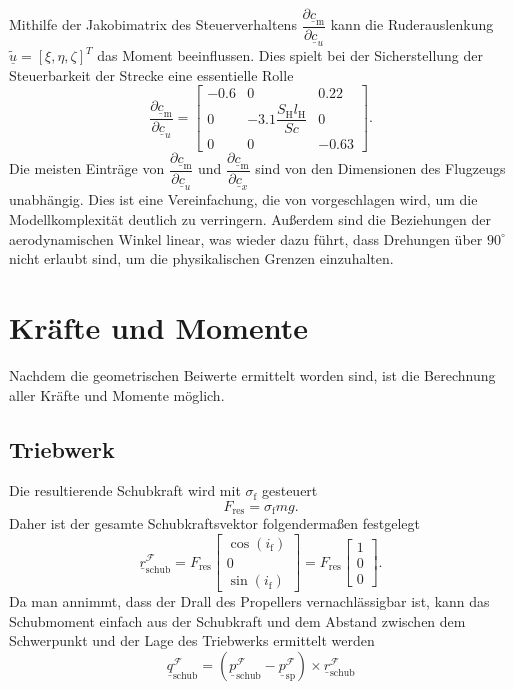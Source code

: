 Mithilfe der Jakobimatrix des Steuerverhaltens $\dfrac{\partial  \underline{c}_\mathrm{m}}{\partial  \underline{c}_u}$ kann die Ruderauslenkung $\tilde{\underline{u}} = [\xi,\eta,
\zeta]^T$ das Moment beeinflussen. Dies spielt bei der Sicherstellung der Steuerbarkeit der Strecke eine essentielle Rolle 
\begin{equation}
\dfrac{\partial  \underline{c}_\mathrm{m}}{\partial  \underline{c}_u} = \begin{bmatrix} 
-0.6 & 0 & 0.22 \\
0 &-3.1\dfrac{S_\mathrm{H}l_\mathrm{H}}{Sc}&0 \\
0 & 0 & -0.63
\end{bmatrix}.
\end{equation}
Die meisten Einträge von $\dfrac{\partial  \underline{c}_\mathrm{m}}{\partial  \underline{c}_u}$ und  $\dfrac{\partial  \underline{c}_\mathrm{m}}{\partial  \underline{c}_x}$ sind von den Dimensionen des Flugzeugs unabhängig. Dies ist eine Vereinfachung, die von \cite{RAMPaper} vorgeschlagen wird, um die Modellkomplexität deutlich  zu verringern. Au{\ss}erdem sind die Beziehungen der aerodynamischen Winkel linear, was wieder dazu führt, dass Drehungen über $90^{\circ}$ nicht erlaubt sind, um die physikalischen Grenzen einzuhalten.
\section{Kräfte und Momente}
\label{sec:Kräfte}
Nachdem die geometrischen Beiwerte ermittelt worden sind, ist die Berechnung aller Kräfte und Momente möglich.
\subsection{Triebwerk}
Die resultierende Schubkraft wird mit $\sigma_\mathrm{f}$ gesteuert
\begin{equation}
F_\mathrm{res} = \sigma_\mathrm{f} mg.
\end{equation}
Daher ist der gesamte Schubkraftsvektor folgenderma{\ss}en festgelegt
\begin{equation}
\underline{r}^\mathcal{F}_\mathrm{schub} = F_\mathrm{res}\begin{bmatrix} 
\cos(i_\mathrm{f})\\
0\\
\sin(i_\mathrm{f})
\end{bmatrix} = F_\mathrm{res}\begin{bmatrix} 
1\\
0\\
0
\end{bmatrix}.
\end{equation}
Da man annimmt, dass der Drall des Propellers vernachlässigbar ist, kann das Schubmoment einfach aus der Schubkraft und dem Abstand zwischen dem Schwerpunkt und der Lage des Triebwerks ermittelt werden
\begin{equation}
\underline{q}^\mathcal{F}_\mathrm{schub} = (\underline{p}_\mathrm{schub}^\mathcal{F}-\underline{p}_\mathrm{sp}^\mathcal{F})\times\underline{r}^\mathcal{F}_\mathrm{schub}
\end{equation} 
